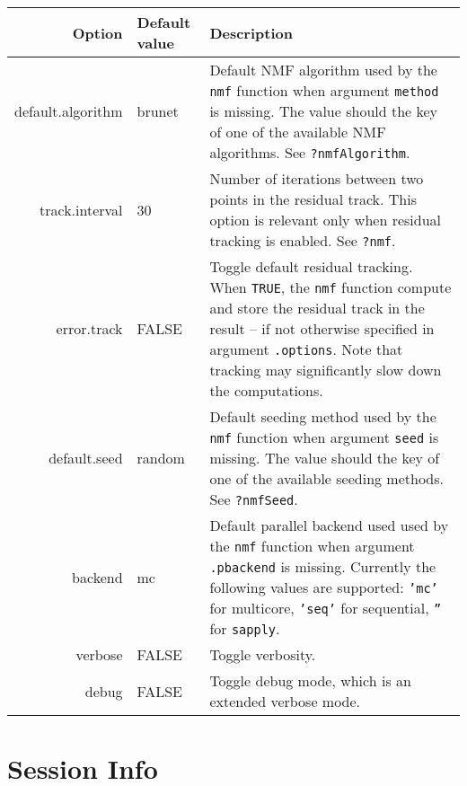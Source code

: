 \documentclass[a4paper]{article}\usepackage{graphicx, color}
\let\code=\texttt
\begin{document}
\begin{table}[ht]
\begin{center}
\begin{tabularx}{\textwidth}{>{\ttfamily}rlX}
  \hline
Option & Default value & Description\\ 
\hline
default.algorithm & brunet & Default NMF algorithm used by the \code{nmf} function when argument \code{method} is missing.
The value should the key of one of the available NMF algorithms. 
See \code{?nmfAlgorithm}.\\ 
track.interval & 30 & Number of iterations between two points in the residual track. 
This option is relevant only when residual tracking is enabled. 
See \code{?nmf}.\\ 
error.track & FALSE & Toggle default residual tracking. 
When \code{TRUE}, the \code{nmf} function compute and store the residual track in the result -- if not otherwise specified in argument \code{.options}.
Note that tracking may significantly slow down the computations.\\ 
default.seed & random & Default seeding method used by the \code{nmf} function when argument \code{seed} is missing.
The value should the key of one of the available seeding methods. 
See \code{?nmfSeed}.\\
backend & mc & Default parallel backend used used by the \code{nmf} function when argument \code{.pbackend} is missing.
Currently the following values are supported: \code{'mc'} for multicore, \code{'seq'} for sequential, \code{''} for \code{sapply}.\\
verbose & FALSE & Toggle verbosity.\\ 
debug & FALSE & Toggle debug mode, which is an extended verbose mode.\\ 
\hline
\end{tabularx}
\end{center}
\caption{}
\end{table}

\pagebreak 
\section{Session Info}
\end{document}
